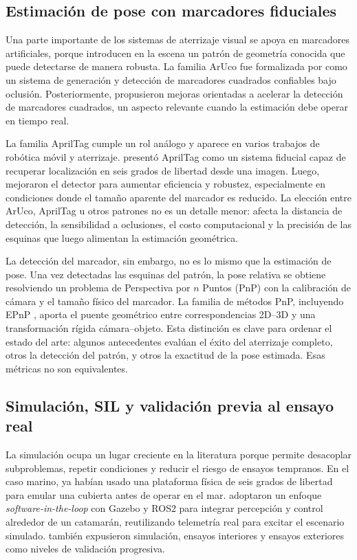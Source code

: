 \documentclass[12pt,a4paper]{report}
\begin{document}
\subsection{Estimación de pose con marcadores fiduciales}

Una parte importante de los sistemas de aterrizaje visual se apoya en
marcadores artificiales, porque introducen en la escena un patrón de geometría
conocida que puede detectarse de manera robusta. La familia ArUco fue
formalizada por \citet{GarridoJurado2014} como un sistema de generación y
detección de marcadores cuadrados confiables bajo oclusión. Posteriormente,
\citet{RomeroRamirez2018} propusieron mejoras orientadas a acelerar la
detección de marcadores cuadrados, un aspecto relevante cuando la estimación
debe operar en tiempo real.

La familia AprilTag cumple un rol análogo y aparece en varios trabajos de
robótica móvil y aterrizaje. \citet{Olson2011} presentó AprilTag como un sistema
fiducial capaz de recuperar localización en seis grados de libertad desde una imagen.
Luego, \citet{WangOlson2016} mejoraron el detector para aumentar eficiencia y
robustez, especialmente en condiciones donde el tamaño aparente del marcador es
reducido. La elección entre ArUco, AprilTag u otros patrones no es
un detalle menor: afecta la distancia de detección, la sensibilidad a
oclusiones, el costo computacional y la precisión de las esquinas que luego
alimentan la estimación geométrica.

La detección del marcador, sin embargo, no es lo mismo que la estimación de
pose. Una vez detectadas las esquinas del patrón, la pose relativa se obtiene
resolviendo un problema de Perspectiva por \(n\) Puntos (PnP) con la calibración
de cámara y el tamaño físico del marcador. La familia de métodos PnP, incluyendo
EPnP \citep{Lepetit2009}, aporta el puente geométrico entre correspondencias
2D--3D y una transformación rígida cámara--objeto. Esta distinción es clave para
ordenar el estado del arte: algunos antecedentes evalúan el éxito del
aterrizaje completo, otros la detección del patrón, y otros la exactitud de la
pose estimada. Esas métricas no son equivalentes.

\subsection{Simulación, SIL y validación previa al ensayo real}

La simulación ocupa un lugar creciente en la literatura porque permite
desacoplar subproblemas, repetir condiciones y reducir el riesgo de ensayos
tempranos. En el caso marino, \citet{SanchezLopez2014} ya habían usado una
plataforma física de seis grados de libertad para emular una cubierta antes de
operar en el mar. \citet{Delbene2022} adoptaron un enfoque
\textit{software-in-the-loop} con Gazebo y ROS2 para integrar percepción y
control alrededor de un catamarán, reutilizando telemetría real para excitar el
escenario simulado. \citet{Keipour2022} también expusieron simulación, ensayos
interiores y ensayos exteriores como niveles de validación progresiva.
\end{document}
